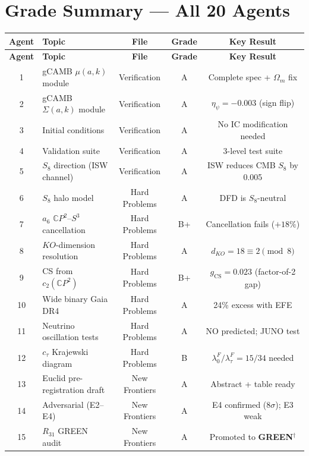 \documentclass[11pt,a4paper]{article}
\newcommand{\GREEN}{\textcolor{dfdgreen}{\textbf{GREEN}}}
\newcommand{\CP}{\mathbb{C}P}
\begin{document}
\section{Grade Summary --- All 20 Agents}
\label{sec:grades}

\begin{center}
\begin{longtable}{clccc}
\toprule
\textbf{Agent} & \textbf{Topic} & \textbf{File} & \textbf{Grade} & \textbf{Key Result} \\
\midrule
\endfirsthead
\toprule
\textbf{Agent} & \textbf{Topic} & \textbf{File} & \textbf{Grade} & \textbf{Key Result} \\
\midrule
\endhead
1 & gCAMB $\mu(a,k)$ module & Verification & A & Complete spec + $\Omega_m$ fix \\
2 & gCAMB $\Sigma(a,k)$ module & Verification & A & $\eta_\psi = -0.003$ (sign flip) \\
3 & Initial conditions & Verification & A & No IC modification needed \\
4 & Validation suite & Verification & A & 3-level test suite \\
5 & $S_8$ direction (ISW channel) & Verification & A & ISW reduces CMB $S_8$ by 0.005 \\
\midrule
6 & $S_8$ halo model & Hard Problems & A & DFD is $S_8$-neutral \\
7 & $a_6$ $\CP^2$--$S^3$ cancellation & Hard Problems & B+ & Cancellation fails ($+18\%$) \\
8 & $KO$-dimension resolution & Hard Problems & A & $d_{KO} = 18 \equiv 2\pmod{8}$ \\
9 & CS from $c_2(\CP^2)$ & Hard Problems & B+ & $g_{\mathrm{CS}} = 0.023$ (factor-of-2 gap) \\
10 & Wide binary Gaia DR4 & Hard Problems & A & 24\% excess with EFE \\
11 & Neutrino oscillation tests & Hard Problems & A & NO predicted; JUNO test \\
12 & $c_\tau$ Krajewski diagram & Hard Problems & B & $\lambda_0^F/\lambda_\tau^F = 15/34$ needed \\
\midrule
13 & Euclid pre-registration draft & New Frontiers & A & Abstract + table ready \\
14 & Adversarial (E2--E4) & New Frontiers & A & E4 confirmed ($8\sigma$); E3 weak \\
15 & $R_{31}$ GREEN audit & New Frontiers & A & Promoted to \GREEN$^\dagger$ \\

\end{longtable}
\end{center}
\end{document}
